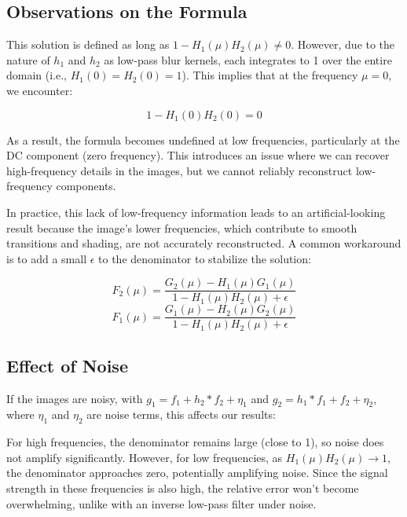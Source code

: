 \documentclass{article}
\begin{document}
\subsection*{Observations on the Formula}

This solution is defined as long as \( 1 - H_1(\mu) H_2(\mu) \neq 0 \). However, due to the nature of \( h_1 \) and \( h_2 \) as low-pass blur kernels, each integrates to 1 over the entire domain (i.e., \( H_1(0) = H_2(0) = 1 \)). This implies that at the frequency \( \mu = 0 \), we encounter:

\[
1 - H_1(0) H_2(0) = 0
\]

As a result, the formula becomes undefined at low frequencies, particularly at the DC component (zero frequency). This introduces an issue where we can recover high-frequency details in the images, but we cannot reliably reconstruct low-frequency components.

In practice, this lack of low-frequency information leads to an artificial-looking result because the image's lower frequencies, which contribute to smooth transitions and shading, are not accurately reconstructed. A common workaround is to add a small \( \epsilon \) to the denominator to stabilize the solution:

\[
F_2(\mu) = \frac{G_2(\mu) - H_1(\mu) G_1(\mu)}{1 - H_1(\mu) H_2(\mu) + \epsilon}
\]
\[
F_1(\mu) = \frac{G_1(\mu) - H_2(\mu) G_2(\mu)}{1 - H_1(\mu) H_2(\mu) + \epsilon}
\]

\subsection*{Effect of Noise}

If the images are noisy, with \( g_1 = f_1 + h_2 * f_2 + \eta_1 \) and \( g_2 = h_1 * f_1 + f_2 + \eta_2 \), where \( \eta_1 \) and \( \eta_2 \) are noise terms, this affects our results:

For high frequencies, the denominator remains large (close to 1), so noise does not amplify significantly. However, for low frequencies, as \( H_1(\mu) H_2(\mu) \to 1 \), the denominator approaches zero, potentially amplifying noise. Since the signal strength in these frequencies is also high, the relative error won't become overwhelming, unlike with an inverse low-pass filter under noise.
\end{document}
